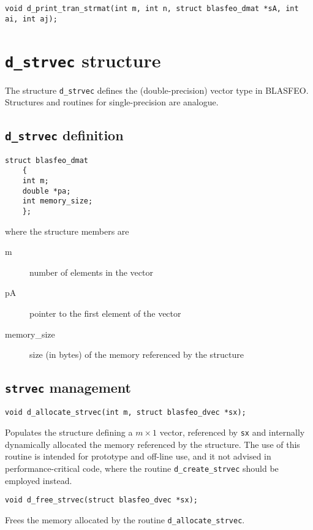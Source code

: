 \documentclass[a4paper]{report}
\begin{document}
\begin{verbatim}
void d_print_tran_strmat(int m, int n, struct blasfeo_dmat *sA, int ai, int aj);
\end{verbatim}



\section{{\tt d\_strvec} structure}

The structure {\tt d\_strvec} defines the (double-precision) vector type in BLASFEO.
Structures and routines for single-precision are analogue.



\subsection{{\tt d\_strvec} definition}

\begin{verbatim}
struct blasfeo_dmat 
    {
    int m;
    double *pa;
    int memory_size;
    };
\end{verbatim}
where the structure members are
\begin{description}
\item[m] number of elements in the vector
\item[pA] pointer to the first element of the vector
\item[memory\_size] size (in bytes) of the memory referenced by the structure
\end{description}



\subsection{{\tt strvec} management}

\begin{verbatim}
void d_allocate_strvec(int m, struct blasfeo_dvec *sx);
\end{verbatim}
Populates the structure defining a $m\times 1$ vector, referenced by {\tt sx} and internally dynamically allocated the memory referenced by the structure.
The use of this routine is intended for prototype and off-line use, and it not advised in performance-critical code, where the routine {\tt d\_create\_strvec} should be employed instead.

\begin{verbatim}
void d_free_strvec(struct blasfeo_dvec *sx);
\end{verbatim}
Frees the memory allocated by the routine {\tt d\_allocate\_strvec}.
\end{document}
